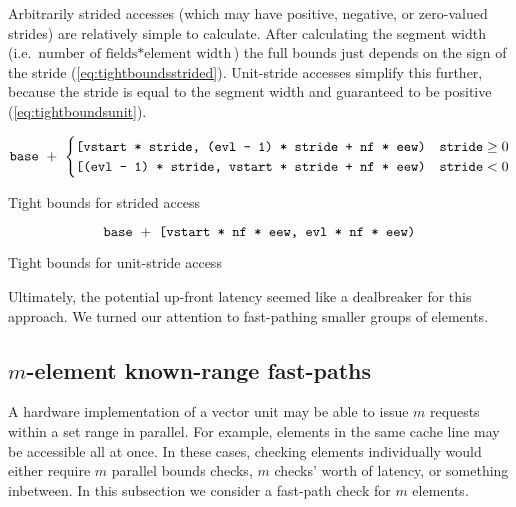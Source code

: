 Arbitrarily strided accesses (which may have positive, negative, or zero-valued strides) are relatively simple to calculate.
After calculating the segment width (i.e. $\text{number of fields} * \text{element width}$) the full bounds just depends on the sign of the stride (\cref{eq:tightboundsstrided}).
Unit-stride accesses simplify this further, because the stride is equal to the segment width and guaranteed to be positive (\cref{eq:tightboundsunit}).

\newcommand{\vstart}{\code{vstart}}
\newcommand{\vstartactive}{\code{vstart}}
\newcommand{\evl}{\code{evl}}
\newcommand{\evlactive}{\code{evl}}
\newcommand{\baseaddr}{\code{base}}

\begin{mycapequ}[!ht]

\begin{equation}\label{eq:tightboundsstrided}
\baseaddr{}\ +\ \begin{cases}
        \code{[\vstartactive{} * \code{stride}, (\evlactive{} - 1) * \code{stride} + \code{nf} * \code{eew})} & \code{stride} \ge 0 \\
            
        \code{[(\evlactive{} - 1) * \code{stride}, \vstartactive{} * \code{stride} + \code{nf} * \code{eew})} & \code{stride} < 0
    \end{cases}
\end{equation}
\caption{Tight bounds for strided access}
\end{mycapequ}

\begin{mycapequ}[!ht]
\begin{equation}\label{eq:tightboundsunit}
    \baseaddr{}\ +\ \code{[\vstartactive{} * \code{nf} * \code{eew}, \evlactive{} * \code{nf} * \code{eew})}
\end{equation}
\caption{Tight bounds for unit-stride access}
\end{mycapequ}

Ultimately, the potential up-front latency seemed like a dealbreaker for this approach.
We turned our attention to fast-pathing smaller groups of elements.

\subsection{$m$-element known-range fast-paths}
A hardware implementation of a vector unit may be able to issue $m$ requests within a set range in parallel.
For example, elements in the same cache line may be accessible all at once.
In these cases, checking elements individually would either require $m$ parallel bounds checks, $m$ checks' worth of latency, or something inbetween.
In this subsection we consider a fast-path check for $m$ elements. 


